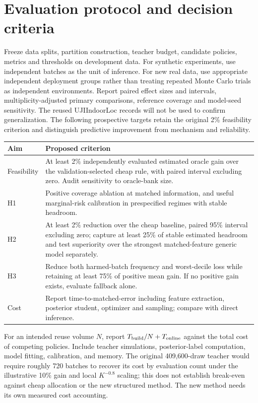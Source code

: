 \documentclass[10pt,letterpaper]{article}
\begin{document}
\section{Evaluation protocol and decision criteria}
Freeze data splits, partition construction, teacher budget, candidate policies, metrics and thresholds on development data. For synthetic experiments, use independent batches as the unit of inference. For new real data, use appropriate independent deployment groups rather than treating repeated Monte Carlo trials as independent environments. Report paired effect sizes and intervals, multiplicity-adjusted primary comparisons, reference coverage and model-seed sensitivity. The reused UJIIndoorLoc records will not be used to confirm generalization. The following prospective targets retain the original 2\% feasibility criterion and distinguish predictive improvement from mechanism and reliability.
\begin{center}\begin{minipage}{\linewidth}\centering\small
\begin{tabularx}{\linewidth}{@{}p{.85in}Y@{}}\toprule
Aim & Proposed criterion\\\midrule
Feasibility & At least 2\% independently evaluated estimated oracle gain over the validation-selected cheap rule, with paired interval excluding zero. Audit sensitivity to oracle-bank size.\\
H1 & Positive coverage ablation at matched information, and useful marginal-risk calibration in prespecified regimes with stable headroom.\\
H2 & At least 2\% reduction over the cheap baseline, paired 95\% interval excluding zero; capture at least 25\% of stable estimated headroom and test superiority over the strongest matched-feature generic model separately.\\
H3 & Reduce both harmed-batch frequency and worst-decile loss while retaining at least 75\% of positive mean gain. If no positive gain exists, evaluate fallback alone.\\
Cost & Report time-to-matched-error including feature extraction, posterior student, optimizer and sampling; compare with direct inference.\\\bottomrule
\end{tabularx}\end{minipage}\end{center}
For an intended reuse volume $N$, report $T_{\rm build}/N+T_{\rm online}$ against the total cost of competing policies. Include teacher simulations, posterior-label computation, model fitting, calibration, and memory. The original 409,600-draw teacher would require roughly 720 batches to recover its cost by evaluation count under the illustrative 10\% gain and local $K^{-0.8}$ scaling; this does not establish break-even against cheap allocation or the new structured method. The new method needs its own measured cost accounting.
\end{document}
